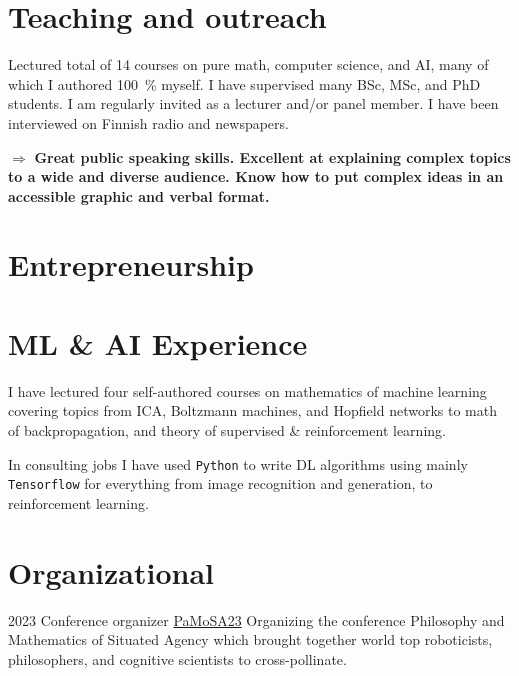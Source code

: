 \documentclass[letterpaper]{twentyonesecondcv}
\begin{document}
{    \section{Teaching and outreach}    

     Lectured total of 14 courses on pure math, computer science, and AI, many of which I authored 100~\% myself. I have supervised many BSc, MSc, and PhD students. I am regularly invited as a lecturer and/or panel member.
     I have been interviewed on Finnish radio and newspapers.
     
      $\Rightarrow$ \textbf{Great public speaking skills.
      Excellent at explaining complex topics to a wide and diverse audience. Know how to put complex ideas in an accessible graphic and verbal format.}
      
    \section{Entrepreneurship}    
    
    \begin{twentyshort} %
    \end{twentyshort}
  

    \section{ML \& AI Experience}    
   
     I have lectured four self-authored courses on mathematics
     of machine learning covering topics from ICA, Boltzmann machines, and 
     Hopfield networks to math of backpropagation, and theory of supervised 
     \& reinforcement learning. 

     \vspace{5pt}

     In consulting jobs I have used \texttt{Python} to write
     DL algorithms using mainly \texttt{Tensorflow} for everything from
     image recognition and generation, to reinforcement learning.

     \section{Organizational}    

     \begin{twenty}
      \twentyitem
        {2023}
        {Conference organizer}
        {\href{https://www.situated-agency.eu}{PaMoSA23}}
        {\small Organizing the conference Philosophy and Mathematics
        of Situated Agency which brought together world top 
        roboticists, philosophers, and cognitive 
        scientists to cross-pollinate.}
      \end{twenty}
}
\end{document}
